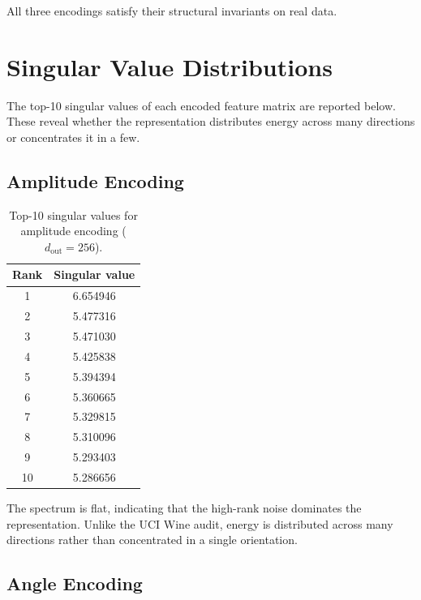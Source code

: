 \documentclass[11pt, a4paper]{article}
\begin{document}
All three encodings satisfy their structural invariants on real data.

\section{Singular Value Distributions}

The top-10 singular values of each encoded feature matrix are reported
below.  These reveal whether the representation distributes energy across
many directions or concentrates it in a few.

\subsection{Amplitude Encoding}

\begin{table}[h]
\centering
\begin{tabular}{cc}
\toprule
\textbf{Rank} & \textbf{Singular value} \\
\midrule
1  & 6.654946 \\
2  & 5.477316 \\
3  & 5.471030 \\
4  & 5.425838 \\
5  & 5.394394 \\
6  & 5.360665 \\
7  & 5.329815 \\
8  & 5.310096 \\
9  & 5.293403 \\
10 & 5.286656 \\
\bottomrule
\end{tabular}
\caption{Top-10 singular values for amplitude encoding ($d_\mathrm{out} = 256$).}
\end{table}

The spectrum is flat, indicating that the high-rank noise dominates the 
representation. Unlike the UCI Wine audit, energy is distributed across 
many directions rather than concentrated in a single orientation.

\subsection{Angle Encoding}
\end{document}
